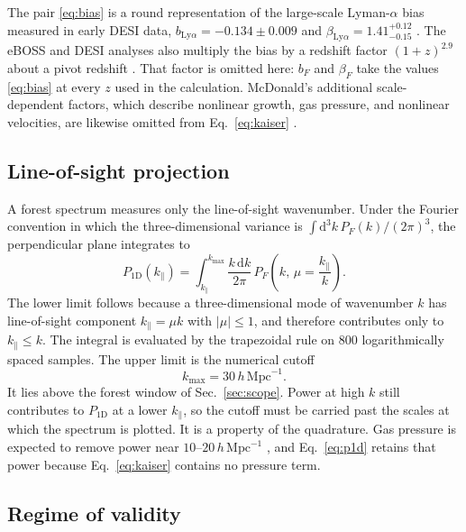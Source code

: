 \documentclass[11pt]{article}
\begin{document}
The pair \eqref{eq:bias} is a round representation of the large-scale Lyman-$\alpha$ bias measured in early DESI data,
$b_{\mathrm{Ly}\alpha} = -0.134 \pm 0.009$ and $\beta_{\mathrm{Ly}\alpha} = 1.41^{+0.12}_{-0.15}$ \citep{Gordon:2023dua}.
The eBOSS and DESI analyses also multiply the bias by a redshift factor $(1+z)^{2.9}$ about a pivot redshift \citep{eBOSS:2020tmo}.
That factor is omitted here: $b_F$ and $\beta_F$ take the values \eqref{eq:bias} at every $z$ used in the calculation.
McDonald's additional scale-dependent factors, which describe nonlinear growth, gas pressure, and nonlinear velocities, are likewise omitted from Eq.~\eqref{eq:kaiser} \citep{McDonald:2001fe}.

\subsection{Line-of-sight projection}

A forest spectrum measures only the line-of-sight wavenumber.
Under the Fourier convention in which the three-dimensional variance is $\int \mathrm{d}^{3}k\,P_F(k)/(2\pi)^{3}$, the perpendicular plane integrates to
\begin{equation}
\label{eq:p1d}
P_{1\mathrm{D}}(k_\parallel)
=
\int_{k_\parallel}^{k_\mathrm{max}}
\frac{k\,\mathrm{d}k}{2\pi}\,
P_F\!\left(k,\,\mu=\frac{k_\parallel}{k}\right).
\end{equation}
The lower limit follows because a three-dimensional mode of wavenumber $k$ has line-of-sight component $k_\parallel = \mu k$ with $|\mu|\le 1$, and therefore contributes only to $k_\parallel \le k$.
The integral is evaluated by the trapezoidal rule on $800$ logarithmically spaced samples.
The upper limit is the numerical cutoff
\begin{equation}
k_\mathrm{max} = 30\,h\,\mathrm{Mpc}^{-1}.
\end{equation}
It lies above the forest window of Sec.~\ref{sec:scope}.
Power at high $k$ still contributes to $P_{1\mathrm{D}}$ at a lower $k_\parallel$, so the cutoff must be carried past the scales at which the spectrum is plotted.
It is a property of the quadrature.
Gas pressure is expected to remove power near $10$--$20\,h\,\mathrm{Mpc}^{-1}$ \citep{McDonald:2001fe}, and Eq.~\eqref{eq:p1d} retains that power because Eq.~\eqref{eq:kaiser} contains no pressure term.

\subsection{Regime of validity}
\end{document}
